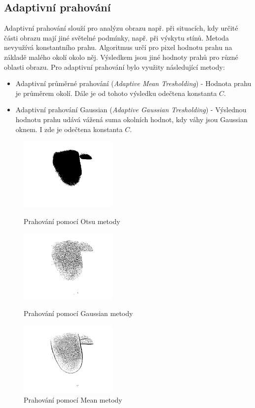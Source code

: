 \subsection{Adaptivní prahování}
Adaptivní prahování slouží pro analýzu obrazu např. při situacích, kdy určité části obrazu mají jiné světelné podmínky, např. při výskytu stínů. Metoda nevyužívá konstantního prahu. Algoritmus určí pro pixel hodnotu prahu na základě malého okolí okolo něj. Výsledkem jsou jiné hodnoty prahů pro různé oblasti obrazu. Pro adaptivní prahování bylo využity následující metody: \cite{OpenCVTresholding}
\begin{itemize}
    \item Adaptivní průměrné prahování (\textit{Adaptive Mean Tresholding}) - Hodnota prahu je průměrem okolí. Dále je od tohoto výsledku odečtena konstanta $C$.
    \item Adaptivní prahování Gaussian (\textit{Adaptive Gaussian Tresholding}) - Výslednou hodnotu prahu udává vážená suma okolních hodnot, kdy váhy jsou Gaussian oknem. I zde je odečtena konstanta $C$.
\end{itemize}

\begin{figure}[!htbp]
  \begin{minipage}[b]{0.3\linewidth}
    \centering
    \includegraphics[width=180px]{obrazky-figures/live25otsu.png}
    \caption{Prahování pomocí Otsu metody}
  \end{minipage}
  \hspace{0.3cm}
  \begin{minipage}[b]{0.3\linewidth}
    \centering
    \includegraphics[width=180px]{obrazky-figures/live25gauss.png}
    \caption{Prahování pomocí Gaussian metody}
  \end{minipage}
  \hspace{0.3cm}
    \begin{minipage}[b]{0.3\linewidth}
    \centering
    \includegraphics[width=180px]{obrazky-figures/live25mean.png}
    \caption{Prahování pomocí Mean metody}
  \end{minipage}
\end{figure}
